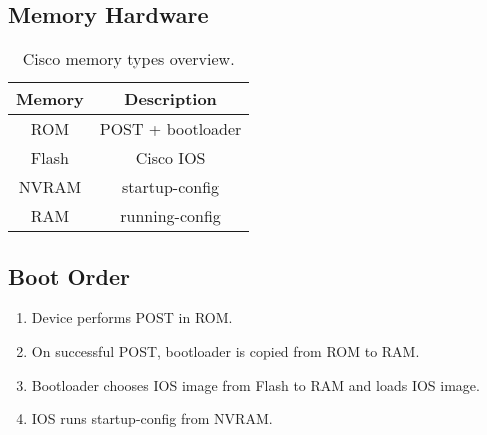 \documentclass[10pt, a4paper, onecolumn, oneside, titlepage, openany]{book}
\begin{document}
\subsection{Memory Hardware}
\begin{table}[h!]
\centering
\begin{tabular}{|c|c|}
    \hline
    \textbf{Memory} & \textbf{Description} \\
    \hline
    ROM & POST + bootloader \\
    Flash & Cisco IOS \\
    NVRAM & startup-config \\
    RAM & running-config \\
    \hline
\end{tabular}
\caption{Cisco memory types overview.}
\label{table:2}
\end{table}
\subsection{Boot Order}
\begin{enumerate}
    \item Device performs POST in ROM.
    \item On successful POST, bootloader is copied from ROM to RAM.
    \item Bootloader chooses IOS image from Flash to RAM and loads IOS image.
    \item IOS runs startup-config from NVRAM.
\end{enumerate}
\end{document}
